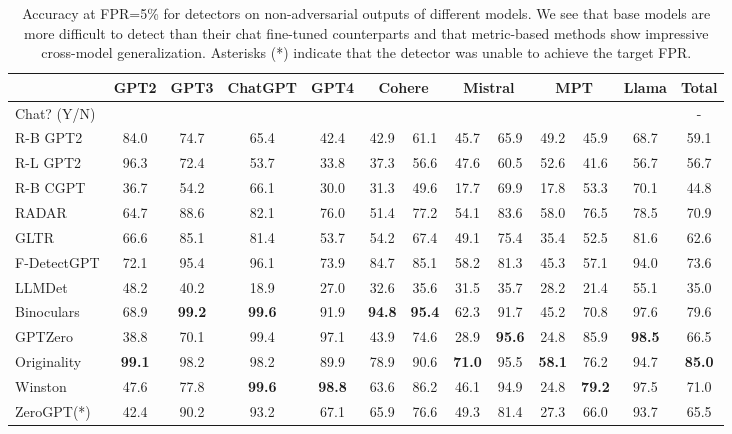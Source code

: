 \documentclass[11pt]{article}
\newcommand{\xmark}{\ding{55}}
\newcommand{\cmark}{\ding{51}}
\begin{document}
\begin{table}[t]
    \small
    \centering
    \begin{tabular}{l|c|c|c|c|c|c|c|c|c|c|c|c}
    \toprule
    &\textbf{GPT2}&\textbf{GPT3}&\textbf{ChatGPT}&\textbf{GPT4}&\multicolumn{2}{c|}{\textbf{Cohere}}&\multicolumn{2}{c|}{\textbf{Mistral}}&\multicolumn{2}{c|}{\textbf{MPT}}&\textbf{Llama}&\textbf{Total}\\
    \midrule
    Chat? (Y/N)&\xmark&\xmark&\cmark&\cmark&\xmark&\cmark&\xmark&\cmark&\xmark&\cmark&\cmark&-\\
    \midrule
    R-B GPT2&84.0&74.7&65.4&42.4&42.9&61.1&45.7&65.9&49.2&45.9&68.7&59.1\\
    R-L GPT2&96.3&72.4&53.7&33.8&37.3&56.6&47.6&60.5&52.6&41.6&56.7&56.7\\
    R-B CGPT&36.7&54.2&66.1&30.0&31.3&49.6&17.7&69.9&17.8&53.3&70.1&44.8\\
    RADAR&64.7&88.6&82.1&76.0&51.4&77.2&54.1&83.6&58.0&76.5&78.5&70.9\\
    \midrule
    GLTR&66.6&85.1&81.4&53.7&54.2&67.4&49.1&75.4&35.4&52.5&81.6&62.6\\
    F-DetectGPT&72.1&95.4&96.1&73.9&84.7&85.1&58.2&81.3&45.3&57.1&94.0&73.6\\
    LLMDet&48.2&40.2&18.9&27.0&32.6&35.6&31.5&35.7&28.2&21.4&55.1&35.0\\
    Binoculars&68.9&\textbf{99.2}&\textbf{99.6}&91.9&\textbf{94.8}&\textbf{95.4}&62.3&91.7&45.2&70.8&97.6&79.6\\
    \midrule
    GPTZero&38.8&70.1&99.4&97.1&43.9&74.6&28.9&\textbf{95.6}&24.8&85.9&\textbf{98.5}&66.5\\
    Originality&\textbf{99.1}&98.2&98.2&89.9&78.9&90.6&\textbf{71.0}&95.5&\textbf{58.1}&76.2&94.7&\textbf{85.0}\\
    Winston&47.6&77.8&\textbf{99.6}&\textbf{98.8}&63.6&86.2&46.1&94.9&24.8&\textbf{79.2}&97.5&71.0\\
    ZeroGPT(*)&42.4&90.2&93.2&67.1&65.9&76.6&49.3&81.4&27.3&66.0&93.7&65.5\\
    \bottomrule
    \end{tabular}
    \caption{Accuracy at FPR=5\% for detectors on non-adversarial outputs of different models. We see that base models are more difficult to detect than their chat fine-tuned counterparts and that metric-based methods show impressive cross-model generalization. Asterisks (*) indicate that the detector was unable to achieve the target FPR.}
    \label{tab:per_model_results}
\end{table}
\end{document}
